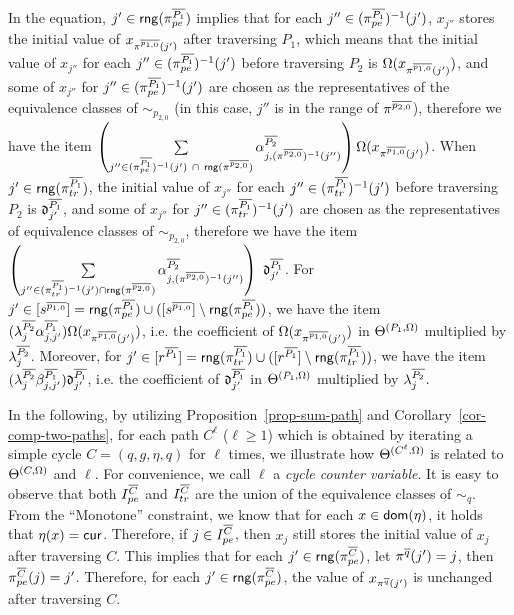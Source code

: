 In the equation, $j' \in  \mathsf{rng}(\pi^{\overline{P_1}}_{pe})$ implies that for each $j'' \in  (\pi^{\overline{P_1}}_{pe})^{-1}(j')$,  $x_{j''}$ stores the initial value of $x_{\pi^{\overline{p_{1,0}}}(j')}$ after traversing $P_1$, which means that the initial value of $x_{j''}$ for each $j'' \in  (\pi^{\overline{P_1}}_{pe})^{-1}(j')$ before traversing $P_2$ is $\Omega(x_{\pi^{\overline{p_{1,0}}}(j')})$, and some of $x_{j''}$ for $j'' \in  (\pi^{\overline{P_1}}_{pe})^{-1}(j')$ are chosen as the representatives of the equivalence classes of $\sim_{p_{2,0}}$ (in this case, $j''$ is in the range of $\pi^{\overline{p_{2,0}}}$), therefore we have the item $\left( \sum \limits_{j'' \in (\pi^{\circled{P_1}}_{pe})^{-1}(j')\ \cap\ \rng(\pi^{\circled{p_{2,0}}})}  \csta^{\circled{P_2}}_{j,(\pi^{\circled{p_{2,0}}})^{-1}(j'')} \right) \initval(x_{\pi^{\circled{p_{1,0}}}(j')})$. When $j' \in \mathsf{rng}(\pi^{\overline{P_1}}_{tr})$, the initial value of $x_{j''}$ for each $j'' \in (\pi^{\overline{P_1}}_{tr})^{-1}(j')$ before traversing $P_2$ is $\mathfrak{d}^{\overline{P_1}}_{j'}$, and some of $x_{j''}$ for $j'' \in (\pi^{\overline{P_1}}_{tr})^{-1}(j')$ are chosen as the representatives of equivalence classes of $\sim_{p_{2,0}}$, therefore we have the item $\left(\sum \limits_{j'' \in (\pi^{\circled{P_1}}_{tr})^{-1}(j') \cap \rng(\pi^{\circled{p_{2,0}}})} \csta^{\circled{P_2}}_{j, (\pi^{\circled{p_{2,0}}})^{-1}(j'')} \right)\ \vard^{\circled{P_1}}_{j'}$.
For $j'\in [s^{\overline{p_{1,0}}}] =\mathsf{rng}(\pi^{\overline{P_1}}_{pe}) \cup ([s^{\overline{p_{1,0}}}] \setminus \mathsf{rng}(\pi^{\overline{P_1}}_{pe}))$, we have the item $(\lambda^{\overline{P_2}}_{j} \alpha^{\overline{P_1}}_{j,j'}) \Omega(x_{\pi^{\overline{p_{1,0}}}(j')})$, i.e. the coefficient of $\Omega(x_{\pi^{\overline{p_{1,0}}}(j')})$ in $\Theta^{(P_1, \Omega)}$ multiplied by $\lambda^{\overline{P_2}}_{j}$. Moreover, for $j'\in [r^{\overline{P_1}}] = \mathsf{rng}(\pi^{\overline{P_1}}_{tr}) \cup ([r^{\overline{P_1}}] \setminus \mathsf{rng}(\pi^{\overline{P_1}}_{tr}))$, we have 
the item $( \lambda^{\overline{P_2}}_{j} \beta^{\overline{P_1}}_{j,j'}) \mathfrak{d}^{\overline{P_1}}_{j'}$, i.e. the coefficient of $\mathfrak{d}^{\overline{P_1}}_{j'}$ in $\Theta^{(P_1, \Omega)}$ multiplied by $\lambda^{\overline{P_2}}_{j}$.

In the following, by utilizing Proposition~\ref{prop-sum-path} and Corollary~\ref{cor-comp-two-paths}, for each path $C^{\ell}$ ($\ell \ge 1$) which is obtained by iterating a simple cycle $C = (q, g, \eta, q)$ for $\ell$ times, we illustrate how $\Theta^{(C^\ell,\Omega)}$ is related to $\Theta^{(C, \Omega)}$ and $\ell$. For convenience, we call $\ell$ a \emph{cycle counter variable}. It is easy to observe that both $I^{\overline{C}}_{pe}$ and $I^{\overline{C}}_{tr}$ are the union of the equivalence classes of $\sim_{q}$. From the ``Monotone'' constraint, we know that for each $x \in \mathsf{dom}(\eta)$, it holds that $\eta(x)=\mathsf{cur}$. Therefore, if $j \in I^{\overline{C}}_{pe}$, then $x_j$ still stores the initial value of $x_j$ after traversing $C$. 
%
This implies that for each $j' \in \mathsf{rng}(\pi^{\overline{C}}_{pe})$, let $\pi^{\overline{q}}(j')=j$, then $\pi^{\overline{C}}_{pe}(j)=j'$.  Therefore, for each $j' \in \mathsf{rng}(\pi^{\overline{C}}_{pe})$, the value of $x_{\pi^{\overline{q}}(j')}$ is unchanged after traversing $C$.

